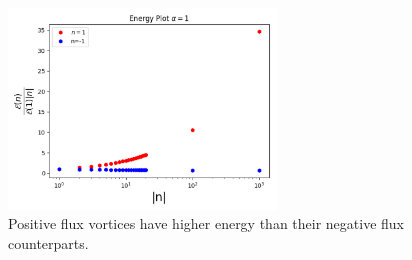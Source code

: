 \begin{figure}[h]
\begin{center}
 \includegraphics[width=2.8in]{Chapter_2_Folder_1912.11321/figures/positive_n_energy.pdf}
     \caption{{\small Positive flux vortices have higher energy than their negative flux counterparts.}} \label{positiveenergy}
    \end{center}
\end{figure}
